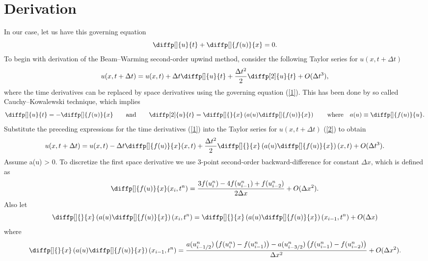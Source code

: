 \documentclass[a4paper, 10pt]{article}
\begin{document}
\section{Derivation}
In our case, let us have this governing equation
\begin{equation}
\label{1}
\diffp[]{u}{t} + \diffp[]{f(u)}{x} = 0.
\end{equation}
To begin with derivation of the Beam--Warming second-order upwind method, consider the following Taylor series for $ u(x, t + \Delta t) $
\begin{equation}
\label{2}
u(x, t + \Delta t) = u(x, t) + \Delta t \diffp[]{u}{t} + \frac{\Delta t^{2}}{2} \diffp[2]{u}{t} + O(\Delta t^{3}),
\end{equation}
where the time derivatives can be replaced by space derivatives using the governing equation (\ref{1}). This has been done by so called Cauchy--Kowalewski technique, which implies
\begin{equation}
\label{3}
\diffp[]{u}{t} = -\diffp[]{f(u)}{x} \qquad \mathrm{and} \qquad \diffp[2]{u}{t} = \diffp[]{}{x} \left( a(u) \diffp[]{f(u)}{x} \right) \qquad \mathrm{where} \quad a(u) \equiv  \diffp[]{f(u)}{u}.
\end{equation}
Substitute the preceding expressions for the time derivatives (\ref{1}) into the Taylor series for $ u(x, t + \Delta t) $ (\ref{2}) to obtain
\begin{equation}
\label{4}
u(x, t + \Delta t) = u(x, t) - \Delta t \diffp[]{f(u)}{x}(x, t) + \frac{\Delta t^{2}}{2} \diffp[]{}{x} \left( a(u) \diffp[]{f(u)}{x} \right)(x, t) + O(\Delta t^{3}).
\end{equation}
Assume a(u) > 0. To discretize the first space derivative we use 3-point second-order backward-difference for constant $ \Delta x $, which is defined as
\begin{equation}
\label{5}
\diffp[]{f(u)}{x} (x_i, t^n) = \frac{3f(u_i^n) - 4f(u_{i-1}^n) + f(u_{i-2}^n)}{2 \Delta x} + O(\Delta x^{2}).
\end{equation}
Also let
\begin{equation}
\label{6}
\diffp[]{}{x} \left( a(u) \diffp[]{f(u)}{x} \right)(x_i, t^n) = \diffp[]{}{x} \left( a(u) \diffp[]{f(u)}{x} \right)(x_{i-1}, t^n) + O(\Delta x)
\end{equation}
where
\begin{equation}
\label{7}
\diffp[]{}{x} \left( a(u) \diffp[]{f(u)}{x} \right)(x_{i-1}, t^n) = \frac{a(u_{i-1/2}^n) \left( f(u_{i}^n) - f(u_{i-1}^n) \right) - a(u_{i-3/2}^n) \left( f(u_{i-1}^n) - f(u_{i-2}^n) \right)}{\Delta x^{2}} + O(\Delta x^{2}).
\end{equation}
\end{document}
